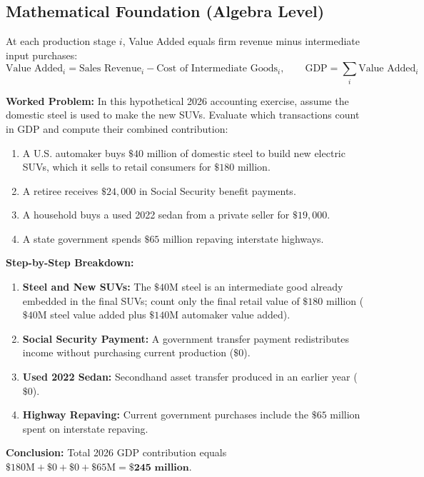 \documentclass[11pt,letterpaper]{article}
\begin{document}
\subsection*{Mathematical Foundation (Algebra Level)}
At each production stage $i$, Value Added equals firm revenue minus intermediate input purchases:
\begin{equation}
\text{Value Added}_i = \text{Sales Revenue}_i - \text{Cost of Intermediate Goods}_i, \qquad \text{GDP} = \sum_{i} \text{Value Added}_i
\end{equation}

\noindent\textbf{Worked Problem:}
In this hypothetical 2026 accounting exercise, assume the domestic steel is used to make the new SUVs. Evaluate which transactions count in GDP and compute their combined contribution:
\begin{enumerate}
    \item A U.S. automaker buys $\$40\text{ million}$ of domestic steel to build new electric SUVs, which it sells to retail consumers for $\$180\text{ million}$.
    \item A retiree receives $\$24{,}000$ in Social Security benefit payments.
    \item A household buys a used 2022 sedan from a private seller for $\$19{,}000$.
    \item A state government spends $\$65\text{ million}$ repaving interstate highways.
\end{enumerate}

\noindent\textbf{Step-by-Step Breakdown:}
\begin{enumerate}
    \item \textbf{Steel and New SUVs:} The $\$40\text{M}$ steel is an intermediate good already embedded in the final SUVs; count only the final retail value of $\$180\text{ million}$ ($\$40\text{M}$ steel value added plus $\$140\text{M}$ automaker value added).
    \item \textbf{Social Security Payment:} A government transfer payment redistributes income without purchasing current production ($\$0$).
    \item \textbf{Used 2022 Sedan:} Secondhand asset transfer produced in an earlier year ($\$0$).
    \item \textbf{Highway Repaving:} Current government purchases include the $\$65\text{ million}$ spent on interstate repaving.
\end{enumerate}
\textbf{Conclusion:} Total 2026 GDP contribution equals $\$180\text{M} + \$0 + \$0 + \$65\text{M} = \mathbf{\$245\text{ million}}$.
\end{document}

